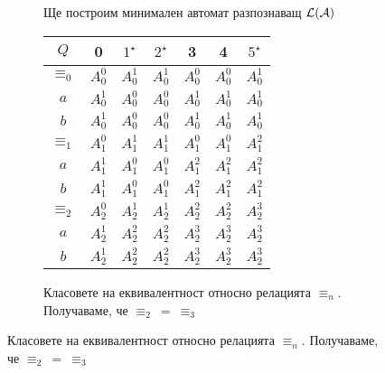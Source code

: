 \begin{example}
\begin{figure}[H]
\begin{subfigure}[b]{0.4\textwidth}
      \caption{Ще построим минимален автомат разпознаващ $\mathcal{L}(\mathcal{A})$}
    \end{subfigure}
    \qquad
    \qquad
    \begin{subfigure}[b]{0.4\textwidth}
      \begin{tabular}{|c|c|c|c|c|c|c|}
        \hline
        $Q$ & 0 & $1^\star$ & $2^\star$ & 3 & 4 & $5^\star$ \\
        \hline
        \hline
        $\equiv_0$ & $A^0_0$ & $A^1_0$ & $A^1_0$ & $A^0_0$ & $A^0_0$ & $A^1_0$\\
        \hline
        $a$ & $A^1_0$& $A^0_0$ & $A^0_0$ & $A^1_0$ & $A^1_0$ & $A^1_0$\\
        \hline
        $b$ & $A^1_0$& $A^0_0$ & $A^0_0$ & $A^1_0$ & $A^1_0$ & $A^1_0$\\
        \hline
        \hline
        $\equiv_1$ & $A^0_1$ & $A^1_1$ & $A^1_1$ & $A^0_1$ & $A^0_1$ & $A^2_1$\\
        \hline
        $a$ & $A^1_1$ & $A^0_1$ & $A^0_1$ & $A^2_1$ & $A^2_1$ & $A^2_1$\\
        \hline
        $b$ & $A^1_1$ & $A^0_1$ & $A^0_1$ & $A^2_1$ & $A^2_1$ & $A^2_1$\\
        \hline
        \hline
        $\equiv_2$ & $A^0_2$ & $A^1_2$ & $A^1_2$ & $A^2_2$ & $A^2_2$ & $A^3_2$\\
        \hline
        $a$ & $A^1_2$ & $A^2_2$ & $A^2_2$ & $A^3_2$ & $A^3_2$ & $A^3_2$\\
        \hline
        $b$ & $A^1_2$ & $A^2_2$ & $A^2_2$ & $A^3_2$ & $A^3_2$ & $A^3_2$\\
        \hline
      \end{tabular}
      \caption{Класовете на еквивалентност относно релацията $\equiv_n$. Получаваме, че $\equiv_2\ =\ \equiv_3$}
    \end{subfigure}
  \end{figure}


\end{example}
